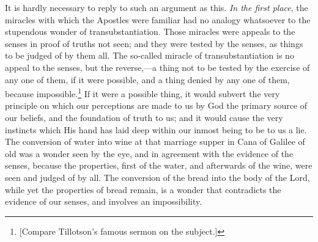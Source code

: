 \documentclass[
  english,
]{book}
\begin{document}
It is hardly necessary to reply to such an argument as this. \emph{In the first place}, the miracles with which the Apostles were familiar had no analogy whatsoever to the stupendous wonder of transubstantiation. Those miracles were appeals to the senses in proof of truths not seen; and they were tested by the senses, as things to be judged of by them all. The so-called miracle of transubstantiation is no appeal to the senses, but the reverse,---a thing not to be tested by the exercise of any one of them, if it were possible, and a thing denied by any one of them, because impossible.\footnote{{[}Compare Tillotson's famous sermon on the subject.{]}} If it were a possible thing, it would subvert the very principle on which our perceptions are made to us by God the primary source of our beliefs, and the foundation of truth to us; and it would cause the very instincts which His hand has laid deep within our inmost being to be to us a lie. The conversion of water into wine at that marriage supper in Cana of Galilee of old was a wonder seen by the eye, and in agreement with the evidence of the senses, because the properties, first of the water, and afterwards of the wine, were seen and judged of by all. The conversion of the bread into the body of the Lord, while yet the properties of bread remain, is a wonder that contradicts the evidence of our senses, and involves an impossibility.
\end{document}
